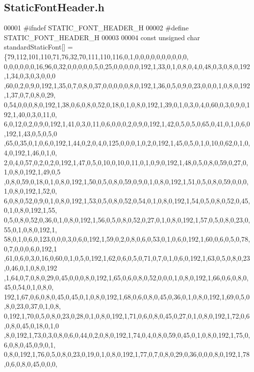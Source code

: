 \subsection{Static\+Font\+Header.\+h}
\label{StaticFontHeader_8h_source}

\begin{DoxyCode}
00001 \textcolor{preprocessor}{#ifndef STATIC\_FONT\_HEADER\_H}
00002 \textcolor{preprocessor}{#define STATIC\_FONT\_HEADER\_H}
00003 
00004 \textcolor{keyword}{const} \textcolor{keywordtype}{unsigned} \textcolor{keywordtype}{char} standardStaticFont[] = \{79,112,101,110,71,76,32,70,111,110,116,0,1,0,0,0,0,0,0,0,0,0,0,
      0,0,0,0,0,0,16,96,0,32,0,0,0,0,0,5,0,25,0,0,0,0,0,192,1,33,0,1,0,8,0,4,0,48,0,3,0,8,0,192,1,34,0,3,0,3,0,0,0
      ,60,0,2,0,9,0,192,1,35,0,7,0,8,0,37,0,0,0,0,0,8,0,192,1,36,0,5,0,9,0,23,0,0,0,1,0,8,0,192,1,37,0,7,0,8,0,29,
      0,54,0,0,0,8,0,192,1,38,0,6,0,8,0,52,0,18,0,1,0,8,0,192,1,39,0,1,0,3,0,4,0,60,0,3,0,9,0,192,1,40,0,3,0,11,0,
      6,0,12,0,2,0,9,0,192,1,41,0,3,0,11,0,6,0,0,0,2,0,9,0,192,1,42,0,5,0,5,0,65,0,41,0,1,0,6,0,192,1,43,0,5,0,5,0
      ,65,0,35,0,1,0,6,0,192,1,44,0,2,0,4,0,125,0,0,0,1,0,2,0,192,1,45,0,5,0,1,0,10,0,62,0,1,0,4,0,192,1,46,0,1,0,
      2,0,4,0,57,0,2,0,2,0,192,1,47,0,5,0,10,0,10,0,11,0,1,0,9,0,192,1,48,0,5,0,8,0,59,0,27,0,1,0,8,0,192,1,49,0,5
      ,0,8,0,59,0,18,0,1,0,8,0,192,1,50,0,5,0,8,0,59,0,9,0,1,0,8,0,192,1,51,0,5,0,8,0,59,0,0,0,1,0,8,0,192,1,52,0,
      6,0,8,0,52,0,9,0,1,0,8,0,192,1,53,0,5,0,8,0,52,0,54,0,1,0,8,0,192,1,54,0,5,0,8,0,52,0,45,0,1,0,8,0,192,1,55,
      0,5,0,8,0,52,0,36,0,1,0,8,0,192,1,56,0,5,0,8,0,52,0,27,0,1,0,8,0,192,1,57,0,5,0,8,0,23,0,55,0,1,0,8,0,192,1,
      58,0,1,0,6,0,123,0,0,0,3,0,6,0,192,1,59,0,2,0,8,0,6,0,53,0,1,0,6,0,192,1,60,0,6,0,5,0,78,0,7,0,0,0,6,0,192,1
      ,61,0,6,0,3,0,16,0,60,0,1,0,5,0,192,1,62,0,6,0,5,0,71,0,7,0,1,0,6,0,192,1,63,0,5,0,8,0,23,0,46,0,1,0,8,0,192
      ,1,64,0,7,0,8,0,29,0,45,0,0,0,8,0,192,1,65,0,6,0,8,0,52,0,0,0,1,0,8,0,192,1,66,0,6,0,8,0,45,0,54,0,1,0,8,0,
      192,1,67,0,6,0,8,0,45,0,45,0,1,0,8,0,192,1,68,0,6,0,8,0,45,0,36,0,1,0,8,0,192,1,69,0,5,0,8,0,23,0,37,0,1,0,8,
      0,192,1,70,0,5,0,8,0,23,0,28,0,1,0,8,0,192,1,71,0,6,0,8,0,45,0,27,0,1,0,8,0,192,1,72,0,6,0,8,0,45,0,18,0,1,0
      ,8,0,192,1,73,0,3,0,8,0,6,0,44,0,2,0,8,0,192,1,74,0,4,0,8,0,59,0,45,0,1,0,8,0,192,1,75,0,6,0,8,0,45,0,9,0,1,
      0,8,0,192,1,76,0,5,0,8,0,23,0,19,0,1,0,8,0,192,1,77,0,7,0,8,0,29,0,36,0,0,0,8,0,192,1,78,0,6,0,8,0,45,0,0,0,

\end{DoxyCode}
